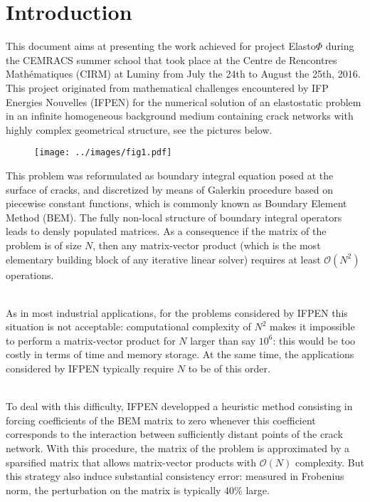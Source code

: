\section*{Introduction}

This document aims at presenting the work achieved for project Elasto$\Phi$ during the CEMRACS summer school  
that took place at the Centre de Rencontres Mathématiques (CIRM) at Luminy from  July the 24th to 
August the 25th, 2016. This project originated from mathematical challenges encountered by IFP Energies Nouvelles (IFPEN)
for the numerical solution of an elastostatic problem in an infinite homogeneous background medium containing crack 
networks with highly complex geometrical structure, see the pictures below. 

\begin{figure}[h!]
\centerline{\texttt{[image: ../images/fig1.pdf]}}
\end{figure}


\noindent 
This problem was reformulated as boundary integral equation posed at the surface of cracks, and 
discretized by means of Galerkin procedure based on piecewise constant functions, which is commonly known as 
Boundary Element Method (BEM). The fully non-local structure of boundary integral operators leads to  
densly populated matrices. As a consequence if the matrix of the problem is of size $N$, 
then any matrix-vector product (which is the most elementary building block of any iterative linear solver)
requires at least $\mathcal{O}(N^{2})$ operations.

\quad\\
As in most industrial applications, for the problems considered by IFPEN this situation is not acceptable: 
computational complexity of $N^{2}$ makes it impossible to perform a matrix-vector product for $N$ larger than
say $10^{6}$: this would be too costly in terms of time and memory storage. At the same time, the  applications 
considered by IFPEN typically require $N$ to be of this order.

\quad\\
To deal with this difficulty, IFPEN developped a heuristic method consisting in forcing coefficients of the 
BEM matrix to zero whenever this coefficient corresponds to the interaction between sufficiently distant points 
of the crack network. With this procedure, the matrix of the problem is approximated by a sparsified matrix that 
allows matrix-vector products with $\mathcal{O}(N)$ complexity. But this strategy also induce substantial consistency 
error: measured in Frobenius norm, the perturbation on the matrix is typically  40\% large.

